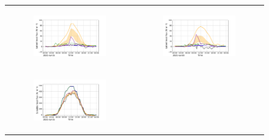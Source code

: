 \begin{figure}[hbtp]
\begin{tabular}{cc}
        \begin{subfigure}[t]{0.5\textwidth}
            \caption{}
            \includegraphics[width=\textwidth]{images/chap5/IOP_TS/TS_2021-07-15_elsplans_flat.png}
        \end{subfigure} &
        \begin{subfigure}[t]{0.5\textwidth}
            \caption{}
            \includegraphics[width=\textwidth]{images/chap5/IOP_TS/TS_2021-07-20_elsplans_flat.png}
        \end{subfigure} \\
        \begin{subfigure}[t]{0.5\textwidth}
            \caption{}
            \includegraphics[width=\textwidth]{images/chap5/IOP_TS/TS_2021-07-15_elsplans_sens.png}

\end{subfigure}
\end{tabular}
\end{figure}
